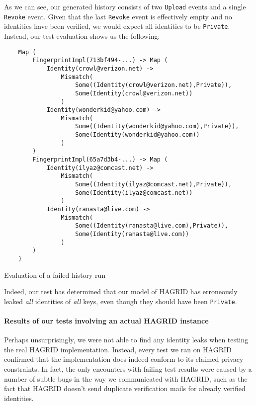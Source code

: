 As we can see, our generated history consists of two \texttt{Upload} events and a single \texttt{Revoke} event. Given that the last \texttt{Revoke} event is effectively empty and no identities have been verified, we would expect all identities to be \texttt{Private}. Instead, our test evaluation shows us the following: 
\begin{code}
    \begin{verbatim}
    Map (
        FingerprintImpl(713bf494-...) -> Map (
            Identity(crowl@verizon.net) -> 
                Mismatch(
                    Some((Identity(crowl@verizon.net),Private)),
                    Some(Identity(crowl@verizon.net))
                )
            Identity(wonderkid@yahoo.com) -> 
                Mismatch(
                    Some((Identity(wonderkid@yahoo.com),Private)),
                    Some(Identity(wonderkid@yahoo.com))
                )
        )
        FingerprintImpl(65a7d3b4-...) -> Map (
            Identity(ilyaz@comcast.net) -> 
                Mismatch(
                    Some((Identity(ilyaz@comcast.net),Private)),
                    Some(Identity(ilyaz@comcast.net))
                )
            Identity(ranasta@live.com) -> 
                Mismatch(
                    Some((Identity(ranasta@live.com),Private)),
                    Some(Identity(ranasta@live.com))
                )
        )
    )   
    \end{verbatim}
    \caption{Evaluation of a failed history run}
\end{code}

Indeed, our test has determined that our model of HAGRID has erroneously leaked \emph{all} identities of \emph{all} keys, even though they should have been \texttt{Private}. 

\paragraph{Results of our tests involving an actual HAGRID instance}
Perhaps unsurprisingly, we were not able to find any identity leaks when testing the real HAGRID implementation. Instead, every test we ran on HAGRID confirmed that the implementation does indeed conform to its claimed privacy constraints.
In fact, the only encounters with failing test results were caused by a number of subtle bugs in the way we communicated with HAGRID, such as the fact that HAGRID doesn't send duplicate verification mails for already verified identities.
